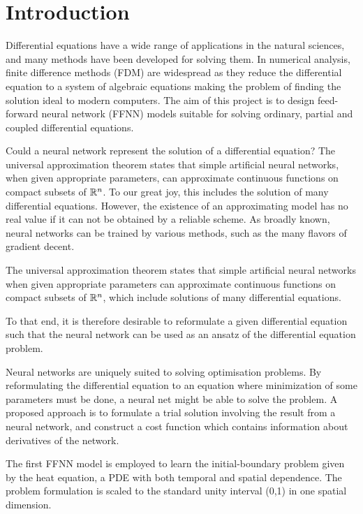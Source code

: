 \section{Introduction}\label{sec:Introduction}

Differential equations have a wide range of applications in the natural sciences, and many methods have been developed for solving them. In numerical analysis, finite difference methods (FDM) are widespread as they reduce the differential equation to a system of algebraic equations making the problem of finding the solution ideal to modern computers. The aim of this project is to design feed-forward neural network (FFNN) models suitable for solving ordinary, partial and coupled differential equations. 

Could a neural network represent the solution of a differential equation? The universal approximation theorem states that simple artificial neural networks, when given appropriate parameters, can approximate continuous functions on compact subsets of $\mathbb{R}^n$. To our great joy, this includes the solution of many differential equations. However, the existence of an approximating model has no real value if it can not be obtained by a reliable scheme. As broadly known, neural networks can be trained by various methods, such as the many flavors of gradient decent. 

The universal approximation theorem states that simple artificial neural networks when given appropriate parameters can approximate continuous functions on compact subsets of $\mathbb{R}^n$, which include solutions of many differential equations. 

To that end, it is therefore desirable to reformulate a given differential equation such that the neural network can be used as an ansatz of the differential equation problem. 

Neural networks are uniquely suited to solving optimisation problems. By reformulating the differential equation to an equation where minimization of some parameters must be done, a neural net might be able to solve the problem. A proposed approach is to formulate a trial solution involving the result from a neural network, and construct a cost function which contains information about derivatives of the network. 


The first FFNN model is employed to learn the initial-boundary problem given by the heat equation, a PDE with both temporal and spatial dependence. The problem formulation is scaled to the standard unity interval (0,1) in one spatial dimension. 

